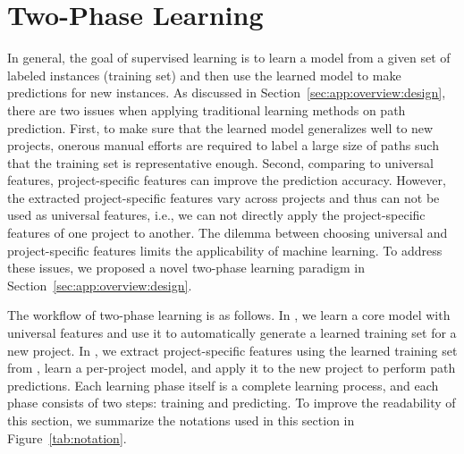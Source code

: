 \documentclass[12pt]{report}	%
\begin{document}
\section{Two-Phase Learning}
\label{sec:app:learning}

In general, the goal of supervised learning is to learn a model from a given
set of labeled instances (training set) and then use the learned model 
to make predictions for new instances. 
%
As discussed in Section~\ref{sec:app:overview:design},
there are two issues when applying traditional learning methods
on path prediction.
First, to make sure that the learned model generalizes well to new projects,
onerous manual efforts are required to label a large size of paths
such that the training set is representative enough.
Second, comparing to universal features,
project-specific features can improve the prediction accuracy.
However, the extracted project-specific features vary across projects
and thus can not be used as universal features,
i.e., we can not directly apply the project-specific features of one project to another.
The dilemma between choosing universal and project-specific features
limits the applicability of machine learning. 
%
To address these issues,
we proposed a novel two-phase learning paradigm in Section~\ref{sec:app:overview:design}.

The workflow of two-phase learning is as follows.
In \phasef, we learn a core model with universal features and
use it to automatically generate a learned training set for a new project.
In \phases, we extract project-specific features using the learned training set from \phasef, 
learn a per-project model, and apply it to the new project
to perform path predictions.
%
Each learning phase itself is a complete
learning process, and each phase consists of two steps: 
training and predicting. 
%
To improve the readability of this section, we summarize 
the notations used in this section in 
Figure~\ref{tab:notation}.
\end{document}
